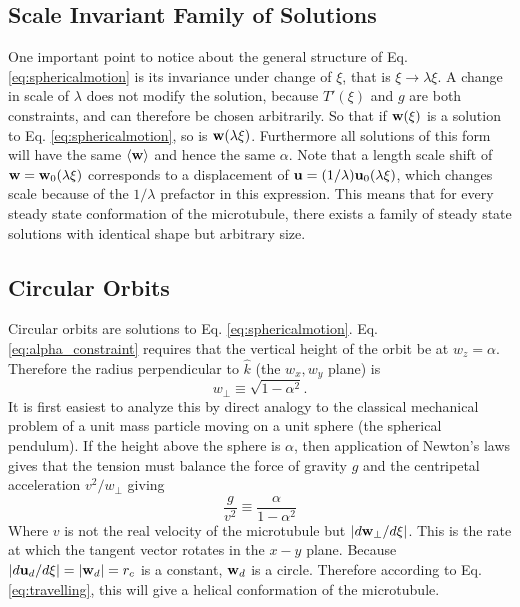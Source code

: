 \documentclass[11pt]{ucthesis}
\def\bu{{\bf u}}
\def\bw{{\bf w}}
\begin{document}
{\subsection{Scale Invariant Family of Solutions}
\label{subsec:ScaleInvariance}

One important point to notice about the general structure of Eq. \ref{eq:sphericalmotion} is its invariance under
change of $\xi$, that is $\xi \rightarrow \lambda \xi$. A change in scale of $\lambda$ does not modify the
solution, because $T'(\xi)$  and $g$ are both constraints, and can therefore be chosen arbitrarily. So that if
$\bw(\xi)$ is a solution to Eq. \ref{eq:sphericalmotion}, so is $\bw(\lambda \xi)$. Furthermore all solutions
of this form will have the same $\langle \bw \rangle$ and hence the same $\alpha$. Note that a length scale
shift of $\bw = \bw_0(\lambda \xi)$ corresponds to a displacement of $\bu = (1/\lambda)\bu_0(\lambda \xi)$, which
changes scale because of the $1/\lambda$ prefactor in this expression. This means that for every
steady state conformation of the microtubule, there exists a family of steady state solutions with identical
shape but arbitrary size.

\subsection{Circular Orbits}
\label{subsec:CircularOrbits}

Circular orbits are solutions to Eq. \ref{eq:sphericalmotion}. Eq. \ref{eq:alpha_constraint} requires that the vertical
height of the orbit be at $w_z = \alpha$. Therefore the radius perpendicular to $\hat k$ (the $w_x, w_y$ plane) is 
\begin{equation}
\label{eq:w_perp_alpha}
w_\perp \equiv \sqrt{1-\alpha^2}. 
\end{equation}
It is first easiest to analyze this by direct analogy to the classical mechanical problem of a unit mass particle moving on a unit sphere (the
spherical pendulum).
If the height above the sphere is $\alpha$, then application of Newton's laws gives that the tension must balance the force
of gravity $g$ and the centripetal acceleration $v^2/w_\perp$ giving
\begin{equation}
\frac{g}{v^2} \equiv \frac{\alpha}{1-\alpha^2} 
\end{equation}
Where $v$ is not the real velocity of the microtubule but $|d \bw_\perp/d\xi|$. This is the rate at which the
tangent vector rotates in the $x-y$ plane. 
Because $|d\bu_d/d\xi|  = |\bw_d| = r_c$ is a constant, $\bw_d$ is a circle. 
Therefore according to Eq. \ref{eq:travelling}, this will give a helical conformation of the microtubule. 


}
\end{document}
